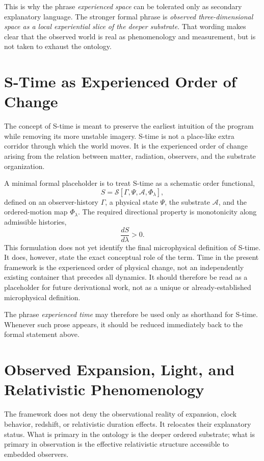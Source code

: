 \documentclass[11pt]{article}
\newcommand{\Order}{\mathcal{S}}
\newcommand{\Sub}{\mathcal{A}}
\begin{document}
This is why the phrase \emph{experienced space} can be tolerated only as secondary explanatory language. The stronger formal phrase is \emph{observed three-dimensional space as a local experiential slice of the deeper substrate}. That wording makes clear that the observed world is real as phenomenology and measurement, but is not taken to exhaust the ontology.

\section{S-Time as Experienced Order of Change}

The concept of S-time is meant to preserve the earliest intuition of the program while removing its more unstable imagery. S-time is not a place-like extra corridor through which the world moves. It is the experienced order of change arising from the relation between matter, radiation, observers, and the substrate organization.

A minimal formal placeholder is to treat S-time as a schematic order functional,
\[
S = \Order[\Gamma,\Psi,\Sub,\Phi_{\lambda}],
\]
defined on an observer-history \(\Gamma\), a physical state \(\Psi\), the substrate \(\Sub\), and the ordered-motion map \(\Phi_{\lambda}\). The required directional property is monotonicity along admissible histories,
\[
\frac{dS}{d\lambda} > 0.
\]
This formulation does not yet identify the final microphysical definition of S-time. It does, however, state the exact conceptual role of the term. Time in the present framework is the experienced order of physical change, not an independently existing container that precedes all dynamics.
It should therefore be read as a placeholder for future derivational work, not as a unique or already-established microphysical definition.

The phrase \emph{experienced time} may therefore be used only as shorthand for S-time. Whenever such prose appears, it should be reduced immediately back to the formal statement above.

\section{Observed Expansion, Light, and Relativistic Phenomenology}

The framework does not deny the observational reality of expansion, clock behavior, redshift, or relativistic duration effects. It relocates their explanatory status. What is primary in the ontology is the deeper ordered substrate; what is primary in observation is the effective relativistic structure accessible to embedded observers.
\end{document}
